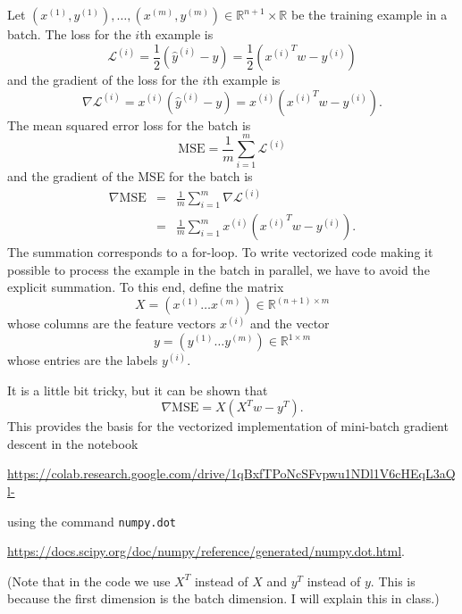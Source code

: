 \documentclass[12pt]{article}
\newcommand{\R}{\mathbb{R}}
\begin{document}
Let $(x^{(1)},y^{(1)}), \ldots, (x^{(m)},y^{(m)})\in \R^{n+1}\times \R$ be the training example in a batch.  
The loss for the $i$th example is
\begin{equation}
\mathcal{L}^{(i)} = \frac{1}{2}(\hat{y}^{(i)} - y) = \frac{1}{2}({x^{(i)}}^T w - y^{(i)})
\end{equation}
and the gradient of the loss for the $i$th example is
\begin{equation}
\nabla \mathcal{L}^{(i)} =  x^{(i)} (\hat{y}^{(i)} - y) = x^{(i)} ({x^{(i)}}^T w - y^{(i)}).
\end{equation}
The mean squared error loss for the batch is
\begin{equation}
\mathrm{MSE} = \frac{1}{m} \sum_{i=1}^m \mathcal{L}^{(i)}
\end{equation}
and the gradient of the MSE for the batch is
\begin{eqnarray}
\nabla \mathrm{MSE} 
&=& 
\frac{1}{m} \sum_{i=1}^m \nabla \mathcal{L}^{(i)} \\
&=& 
\frac{1}{m} \sum_{i=1}^m x^{(i)} ({x^{(i)}}^T w - y^{(i)}).
\end{eqnarray}
The summation corresponds to a for-loop.  To write vectorized code making it possible to process the example in the batch in parallel, we have to avoid the explicit summation. 
To this end, define the matrix 
\begin{equation}
X = (x^{(1)} \ldots x^{(m)})\in\R^{(n+1) \times m}
\end{equation}
whose columns are the feature vectors $x^{(i)}$ and the vector
\begin{equation}
y = (y^{(1)} \ldots y^{(m)})\in\R^{1\times m}
\end{equation}
whose entries are the labels $y^{(i)}$.

It is a little bit tricky, but it can be shown that
\begin{equation}
\nabla \mathrm{MSE} = X (X^T w - y^T).
\end{equation}
This provides the basis for the vectorized implementation of mini-batch gradient descent in the notebook

\noindent
{\footnotesize \url{https://colab.research.google.com/drive/1qBxfTPoNcSFvpwu1NDl1V6cHEqL3aQl-}}

\noindent
using the command \texttt{numpy.dot} 

\noindent
{\footnotesize \url{https://docs.scipy.org/doc/numpy/reference/generated/numpy.dot.html}}.

\noindent
(Note that in the code we use $X^T$ instead of $X$ and $y^T$ instead of $y$. This is because the first dimension is the batch dimension. I will explain this in class.)
\end{document}
